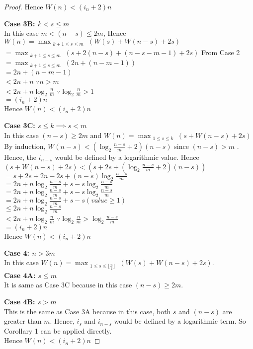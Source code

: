 \begin{appendix}
\begin{proof}
Hence $W(n)<(i_n+2)n$

\noindent
\textbf{Case 3B: $ k < s \leq m $}\\
In this case $m < (n-s)\leq 2m$, Hence
\\$W(n)=\max_{\substack{k+1 \leq s \leq m}}(W(s)+ W(n-s)+2s)$
\\$=\max_{\substack{k+1 \leq s \leq m}}(s + 2(n-s) + (n-s-m-1) + 2s)$ {\hfill From Case 2}
\\$=\max_{\substack{k+1 \leq s \leq m}}(2n + (n-m-1))$
\\$=2n + (n-m-1)$
\\$<2n + n $ {\hfill $\because n>m$}
\\$<2n + n\log_2{\frac{n}{m}} $ {\hfill $\because \log_2{\frac{n}{m}}>1$}
\\$=(i_n + 2)n$
\\Hence $W(n)<(i_n+2)n$

\noindent
\textbf{Case 3C: $ s \leq k \implies s<m$}\\
In this case $(n-s)\geq 2m$ and $W(n)=\max_{\substack{1 \leq s \leq  k}}(s + W(n-s)+2s)$
\\
By induction, $W(n-s)<(\log_2{\frac{n-s}{m}} +2)(n-s)$ since $(n-s)>m$ . Hence, the $i_{n-s}$ would be defined by a logarithmic value. Hence
\\$(s + W(n-s)+2s)<(s+2s+(\log_2{\frac{n-s}{m}} +2)(n-s))$
\\$=s+2s+2n-2s+(n-s)\log_2{\frac{n-s}{m}}$
\\$=2n + n\log_2{\frac{n-s}{m}} +s -s\log_2{\frac{n-s}{m}}$
\\$=2n + n\log_2{\frac{n-s}{m}} +s -s\log_2{\frac{n-s}{m}}$
\\$=2n + n\log_2{\frac{n-s}{m}} +s -s(value \geq 1)$
\\$\leq 2n + n\log_2{\frac{n-s}{m}}$
\\$< 2n + n\log_2{\frac{n}{m}}$ {\hfill $\because \log_2{\frac{n}{m}} > \log_2{\frac{n-s}{m}}$}
\\$=(i_n + 2)n$
\\Hence $W(n)<(i_n+2)n$


\noindent
\textbf{Case 4: $ n > 3m$}\\
In this case $W(n)=\max_{\substack{1 \leq s \leq \lfloor \frac{n}{2}\rfloor}}(W(s)+ W(n-s)+2s)$.
\\
\noindent
\textbf{Case 4A: $ s \leq m $ }\\
It is same as Case 3C because in this case $(n-s)\geq 2m$.

\noindent
\textbf{Case 4B: $ s > m $}\\
This is the same as Case 3A because in this case, both $s$ and $(n-s)$ are greater than $m$. Hence, $i_s$ and $i_{n-s}$ would be defined by a logarithmic term. So Corollary 1 can be applied directly.
\\Hence $W(n)<(i_n+2)n$


\vspace{5mm}
\noindent

\end{proof}
\end{appendix}